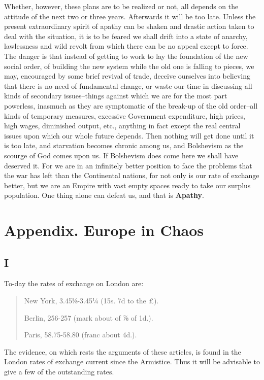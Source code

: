\documentclass{book}
\newcommand\mdstrong[1]{\textbf{#1}}
\newenvironment{mdblockquote}{%
  \begin{quotation}
    \itshape
}{%
  \end{quotation}
}
\begin{document}
Whether, however, these plans are to be realized or not, all depends on the attitude of the next two or three years. Afterwards it will be too late. Unless the present extraordinary spirit of apathy can be shaken and drastic action taken to deal with the situation, it is to be feared we shall drift into a state of anarchy, lawlessness and wild revolt from which there can be no appeal except to force. The danger is that instead of getting to work to lay the foundation of the new social order, of building the new system while the old one is falling to pieces, we may, encouraged by some brief revival of trade, deceive ourselves into believing that there is no need of fundamental change, or waste our time in discussing all kinds of secondary issues–things against which we are for the most part powerless, inasmuch as they are symptomatic of the break-up of the old order–all kinds of temporary measures, excessive Government expenditure, high prices, high wages, diminished output, etc., anything in fact except the real central issues upon which our whole future depends. Then nothing will get done until it is too late, and starvation becomes chronic among us, and Bolshevism as the scourge of God comes upon us. If Bolshevism does come here we shall have deserved it. For we are in an infinitely better position to face the problems that the war has left than the Continental nations, for not only is our rate of exchange better, but we are an Empire with vast empty spaces ready to take our surplus population. One thing alone can defeat us, and that is \mdstrong{Apathy}.

\chapter*{Appendix. Europe in Chaos\footnotemark[1]}
\label{chapter-13}
\section*{I}
To-day the rates of exchange on London are:

\begin{mdblockquote}
New York, 3.45⅛-3.45¼ (15s. 7d to the £).

Berlin, 256-257 (mark about of ⅞ of 1d.).

Paris, 58.75-58.80 (franc about 4d.).


\end{mdblockquote}
The evidence, on which rests the arguments of these articles, is found in the London rates of exchange current since the Armistice. Thus it will be advisable to give a few of the outstanding rates.
\end{document}
